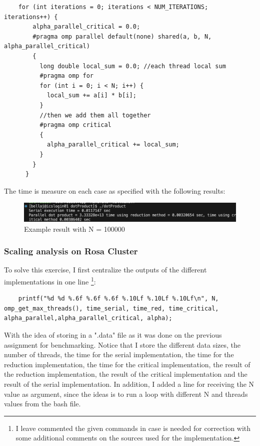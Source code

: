 \documentclass[unicode,11pt,a4paper,oneside,numbers=endperiod,openany]{scrartcl}
\begin{document}
\begin{lstlisting}
    for (int iterations = 0; iterations < NUM_ITERATIONS; iterations++) {
        alpha_parallel_critical = 0.0;
        #pragma omp parallel default(none) shared(a, b, N, alpha_parallel_critical)
        {
          long double local_sum = 0.0; //each thread local sum
          #pragma omp for
          for (int i = 0; i < N; i++) {
            local_sum += a[i] * b[i];
          }
          //then we add them all together
          #pragma omp critical
          {
            alpha_parallel_critical += local_sum;
          }
        }
      }
\end{lstlisting}

The time is measure on each case as specified with the following results: 

\begin{figure}[H]
    \centering
    \includegraphics[width=\textwidth]{./img/exe1/image.png}
    \caption{Example result with N = 100000}
\end{figure}

\subsubsection{Scaling analysis on Rosa Cluster}
To solve this exercise, I first centralize the outputs of the different implementations in one line \footnote{I leave commented the given commands in case is needed for correction with some additional comments on the sources 
used for the implementation.}:

\begin{lstlisting}
    printf("%d %d %.6f %.6f %.6f %.10Lf %.10Lf %.10Lf\n", N, omp_get_max_threads(), time_serial, time_red, time_critical, alpha_parallel,alpha_parallel_critical, alpha);
\end{lstlisting}

With the idea of storing in a ".data" file as it was done on the previous assignment for benchmarking. 
Notice that I store the different data sizes, the number of threads, the time for the serial implementation, the time for the reduction implementation, the time for the critical implementation, 
the result of the reduction implementation, the result of the critical implementation and the result of the serial implementation.
In addition, I added a line for receiving the N value as argument, since the ideas is to run a loop with different N and threads values from the bash file. 
\end{document}

